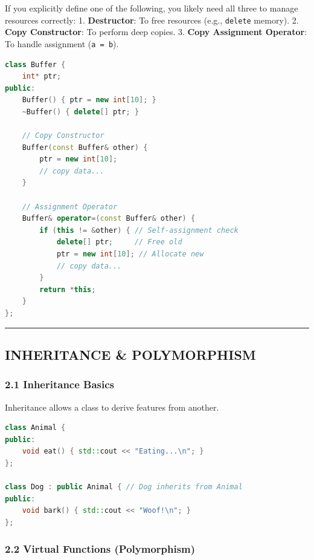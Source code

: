 If you explicitly define one of the following, you likely need all three
to manage resources correctly: 1. \textbf{Destructor}: To free resources
(e.g., \passthrough{\lstinline!delete!} memory). 2. \textbf{Copy
Constructor}: To perform deep copies. 3. \textbf{Copy Assignment
Operator}: To handle assignment (\passthrough{\lstinline!a = b!}).

\begin{lstlisting}[language={C++}]
class Buffer {
    int* ptr;
public:
    Buffer() { ptr = new int[10]; }
    ~Buffer() { delete[] ptr; }

    // Copy Constructor
    Buffer(const Buffer& other) {
        ptr = new int[10];
        // copy data...
    }

    // Assignment Operator
    Buffer& operator=(const Buffer& other) {
        if (this != &other) { // Self-assignment check
            delete[] ptr;     // Free old
            ptr = new int[10]; // Allocate new
            // copy data...
        }
        return *this;
    }
};
\end{lstlisting}

\begin{center}\rule{0.5\linewidth}{0.5pt}\end{center}

\hypertarget{inheritance-polymorphism}{%
\subsection{INHERITANCE \&
POLYMORPHISM}\label{inheritance-polymorphism}}

\hypertarget{inheritance-basics}{%
\subsubsection{2.1 Inheritance Basics}\label{inheritance-basics}}

Inheritance allows a class to derive features from another.

\begin{lstlisting}[language={C++}]
class Animal {
public:
    void eat() { std::cout << "Eating...\n"; }
};

class Dog : public Animal { // Dog inherits from Animal
public:
    void bark() { std::cout << "Woof!\n"; }
};
\end{lstlisting}

\hypertarget{virtual-functions-polymorphism}{%
\subsubsection{2.2 Virtual Functions
(Polymorphism)}\label{virtual-functions-polymorphism}}

